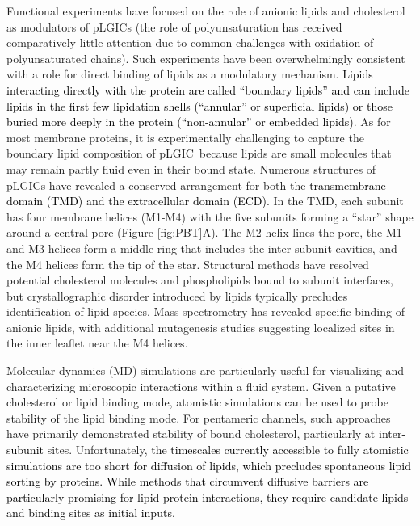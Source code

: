 \documentclass[%
 aip,
 amsmath,amssymb,
 preprint,%
]{revtex4-1}\usepackage{setspace}
\newcommand{\liam}[1]{\textcolor{black}{#1}}
\newcommand{\grace}[1]{\textcolor{black}{{#1}}}
\newcommand{\plgic}{pLGIC}
\begin{document}
Functional experiments have focused on the role of anionic lipids and cholesterol as modulators of \plgic s  \cite{Ellena1983,Fong1986,Fong1987,Jones1988,Sunshine1994,DaCosta2009b,Dalziel1980,Addona1998,Criado1983} (the role of polyunsaturation has received comparatively little attention due to common challenges with oxidation of polyunsaturated chains). Such experiments have been overwhelmingly consistent with a role for direct binding of lipids as a modulatory mechanism.  \grace{Lipids interacting directly with the protein are called ``boundary lipids'' and can include lipids in the first few lipidation shells (``annular'' or superficial lipids) or those buried more deeply in the protein (``non-annular'' or embedded lipids).}  %
As for most membrane proteins, it is experimentally challenging to capture the boundary lipid composition of \plgic~because lipids are small molecules that may remain partly fluid even in their bound state. Numerous structures of \plgic s have revealed a conserved arrangement for both the \grace{transmembrane domain (TMD) and the extracellular domain (ECD)}. In the TMD, each subunit has four membrane helices (M1-M4) with the five subunits forming a ``star'' shape around a central pore (Figure \ref{fig:PBT}A). The M2 helix lines the pore, the M1 and M3 helices form a middle ring that includes the inter-subunit cavities, and the M4 helices form the tip of the star.  Structural methods have resolved potential cholesterol molecules\cite{Laverty2017, Budelier2019} and phospholipids \cite{Basak2017, Henault2019, Kim2020} bound to subunit interfaces, but crystallographic disorder introduced by lipids typically precludes identification of lipid species. Mass spectrometry has revealed specific binding of anionic lipids, with additional mutagenesis studies suggesting localized sites in the inner leaflet near the M4 helices. \cite{Tong2019} %

Molecular dynamics (MD) simulations are particularly useful for visualizing and characterizing microscopic interactions within a fluid system. Given a putative cholesterol or lipid binding mode, atomistic simulations can be used to probe stability of the lipid binding mode.  For pentameric channels, such approaches have primarily demonstrated stability of bound cholesterol\cite{Brannigan2008}, particularly at \liam{inter-subunit} sites\cite{Laverty2017,Henin2014a}.  Unfortunately, \grace{the timescales currently accessible to fully atomistic simulations are too short for diffusion of lipids, which precludes spontaneous lipid sorting by proteins. While methods that circumvent diffusive barriers are particularly promising\cite{Salari2019, Corey2019} for lipid-protein interactions, they require candidate lipids and binding sites as initial inputs.}
\end{document}
